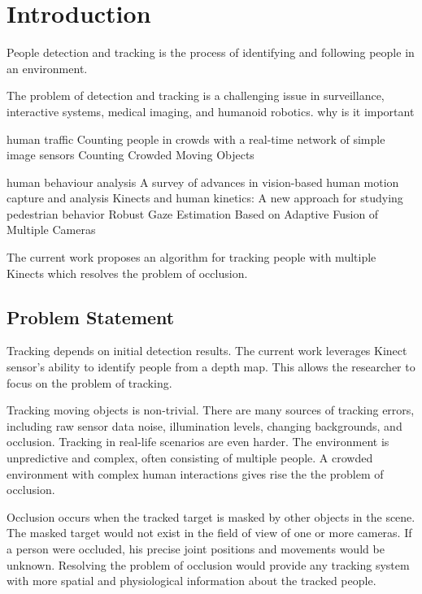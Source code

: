 


\chapter{Introduction}

\label{chapter:introduction}

People detection and tracking is the process of identifying and following people in an environment. 

The problem of detection and tracking is a challenging issue in surveillance, interactive systems, medical imaging, and humanoid robotics. why is it important

human traffic
Counting people in crowds with a real-time network of simple image sensors
Counting Crowded Moving Objects

human behaviour analysis
A survey of advances in vision-based human motion capture and analysis
Kinects and human kinetics: A new approach for studying pedestrian behavior
Robust Gaze Estimation Based on Adaptive Fusion of Multiple Cameras

The current work proposes an algorithm for tracking people with multiple Kinects which resolves the problem of occlusion.

\section{Problem Statement}
\label{sec:introduction_problem_statement}

Tracking depends on initial detection results. The current work leverages Kinect sensor's ability to identify people from a depth map. This allows the researcher to focus on the problem of tracking.

Tracking moving objects is non-trivial. There are many sources of tracking errors, including raw sensor data noise, illumination levels, changing backgrounds, and occlusion. Tracking in real-life scenarios are even harder. The environment is unpredictive and complex, often consisting of multiple people. A crowded environment with complex human interactions gives rise the the problem of occlusion.

Occlusion occurs when the tracked target is masked by other objects in the scene. The masked target would not exist in the field of view of one or more cameras. If a person were occluded, his precise joint positions and movements would be unknown. Resolving the problem of occlusion would provide any tracking system with more spatial and physiological information about the tracked people.


